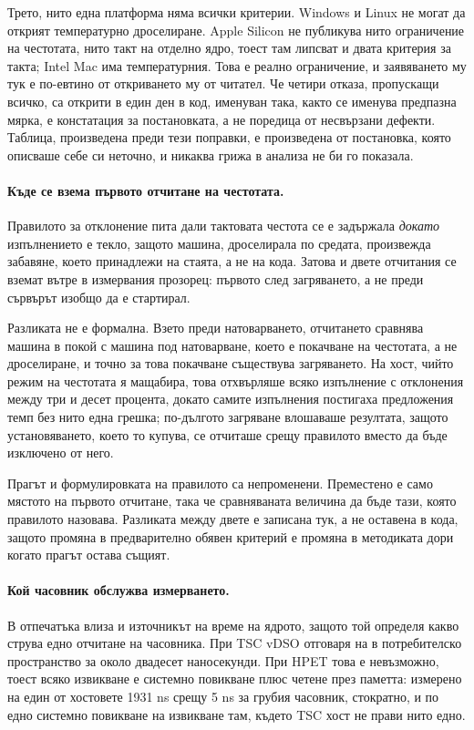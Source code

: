 Трето, нито една платформа няма всички критерии. Windows и Linux не могат да открият
температурно дроселиране. Apple Silicon не публикува нито ограничение на честотата, нито такт
на отделно ядро, тоест там липсват и двата критерия за такта; Intel Mac има температурния.
Това е реално ограничение, и заявяването му тук е по-евтино от откриването му от читател.
Че четири отказа, пропускащи всичко, са открити в един ден в код, именуван така, както се
именува предпазна мярка, е констатация за постановката, а не поредица от несвързани дефекти.
Таблица, произведена преди тези поправки, е произведена от постановка, която описваше себе
си неточно, и никаква грижа в анализа не би го показала.

\paragraph{Къде се взема първото отчитане на честотата.} Правилото за отклонение пита
дали тактовата честота се е задържала \emph{докато} изпълнението е текло, защото машина,
дроселирала по средата, произвежда забавяне, което принадлежи на стаята, а не на кода.
Затова и двете отчитания се вземат вътре в измервания прозорец: първото след загряването, а
не преди сървърът изобщо да е стартирал.

Разликата не е формална. Взето преди натоварването, отчитането сравнява машина в покой с
машина под натоварване, което е покачване на честотата, а не дроселиране, и точно за това
покачване съществува загряването. На хост, чийто режим на честотата я мащабира, това
отхвърляше всяко изпълнение с отклонения между три и десет процента, докато самите
изпълнения постигаха предложения темп без нито една грешка; по-дългото загряване влошаваше
резултата, защото установяването, което то купува, се отчиташе срещу правилото вместо да
бъде изключено от него.

Прагът и формулировката на правилото са непроменени. Преместено е само мястото на първото
отчитане, така че сравняваната величина да бъде тази, която правилото назовава. Разликата
между двете е записана тук, а не оставена в кода, защото промяна в предварително обявен
критерий е промяна в методиката дори когато прагът остава същият.

\paragraph{Кой часовник обслужва измерването.} В отпечатъка влиза и източникът на време на
ядрото, защото той определя какво струва едно отчитане на часовника. При TSC vDSO отговаря на
 в потребителско пространство за около двадесет наносекунди. При HPET това
е невъзможно, тоест всяко извикване е системно повикване плюс четене през паметта: измерено на
един от хостовете 1931 ns срещу 5 ns за грубия часовник, стократно, и по едно системно
повикване на извикване там, където TSC хост не прави нито едно.

